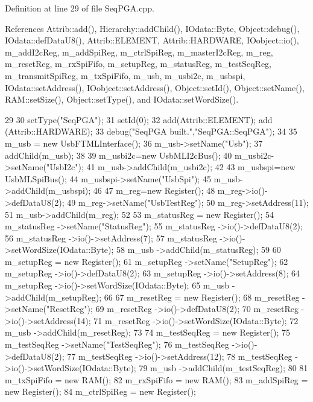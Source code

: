 Definition at line 29 of file SeqPGA.cpp.

References Attrib::add(), Hierarchy::addChild(), IOdata::Byte, Object::debug(), IOdata::defDataU8(), Attrib::ELEMENT, Attrib::HARDWARE, IOobject::io(), m\_\-addI2cReg, m\_\-addSpiReg, m\_\-ctrlSpiReg, m\_\-masterI2cReg, m\_\-reg, m\_\-resetReg, m\_\-rxSpiFifo, m\_\-setupReg, m\_\-statusReg, m\_\-testSeqReg, m\_\-transmitSpiReg, m\_\-txSpiFifo, m\_\-usb, m\_\-usbi2c, m\_\-usbspi, IOdata::setAddress(), IOobject::setAddress(), Object::setId(), Object::setName(), RAM::setSize(), Object::setType(), and IOdata::setWordSize().


\begin{DoxyCode}
29               {
30   setType("SeqPGA");
31   setId(0);
32   add(Attrib::ELEMENT); add (Attrib::HARDWARE);
33   debug("SeqPGA built.","SeqPGA::SeqPGA");
34   
35   m_usb = new UsbFTMLInterface();
36   m_usb->setName("Usb");
37   addChild(m_usb);
38   
39   m_usbi2c=new UsbMLI2cBus();
40   m_usbi2c->setName("UsbI2c");
41   m_usb->addChild(m_usbi2c);
42   
43   m_usbspi=new UsbMLSpiBus();
44   m_usbspi->setName("UsbSpi");
45   m_usb->addChild(m_usbspi);
46   
47   m_reg=new Register();
48   m_reg->io()->defDataU8(2);
49   m_reg->setName("UsbTestReg");
50   m_reg->setAddress(11);
51   m_usb->addChild(m_reg);
52    
53   m_statusReg       = new Register();
54   m_statusReg       ->setName("StatusReg");
55   m_statusReg       ->io()->defDataU8(2);
56   m_statusReg       ->io()->setAddress(7);
57   m_statusReg       ->io()->setWordSize(IOdata::Byte);
58   m_usb            ->addChild(m_statusReg);
59 
60   m_setupReg       = new Register();
61   m_setupReg       ->setName("SetupReg");
62   m_setupReg       ->io()->defDataU8(2);
63   m_setupReg       ->io()->setAddress(8);
64   m_setupReg       ->io()->setWordSize(IOdata::Byte);
65   m_usb            ->addChild(m_setupReg);
66 
67   m_resetReg       = new Register();
68   m_resetReg       ->setName("ResetReg");
69   m_resetReg       ->io()->defDataU8(2);
70   m_resetReg       ->io()->setAddress(14);
71   m_resetReg       ->io()->setWordSize(IOdata::Byte);
72   m_usb            ->addChild(m_resetReg);
73 
74   m_testSeqReg     = new Register();
75   m_testSeqReg     ->setName("TestSeqReg");
76   m_testSeqReg     ->io()->defDataU8(2);
77   m_testSeqReg     ->io()->setAddress(12);
78   m_testSeqReg     ->io()->setWordSize(IOdata::Byte);
79   m_usb            ->addChild(m_testSeqReg);
80 
81   m_txSpiFifo         = new RAM();
82   m_rxSpiFifo         = new RAM();
83   m_addSpiReg         = new Register();
84   m_ctrlSpiReg        = new Register();
}
\end{DoxyCode}
